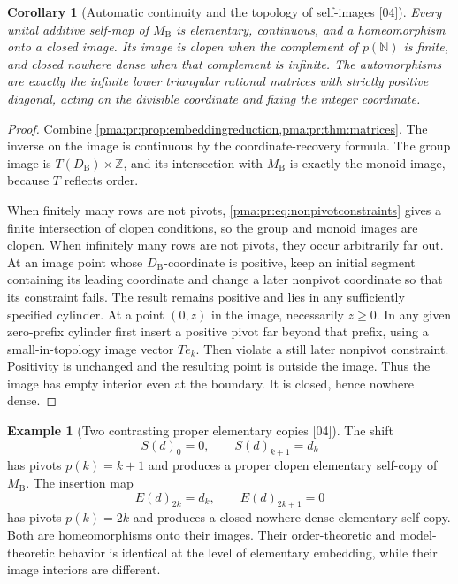 \documentclass[11pt]{article}
\numberwithin{equation}{section}
\newtheorem{corollary}[corollary]{Corollary}
\theoremstyle{definition}
\newtheorem{example}[example]{Example}
\theoremstyle{remark}
\newcommand{\N}{\mathbb N}
\newcommand{\Z}{\mathbb Z}
\newcommand{\MB}{M_{\mathrm B}}
\newcommand{\src}[1]{\textup{\textsf{\small[#1]}}}
\begin{document}
\begin{corollary}[Automatic continuity and the topology of self-images \src{04}]
\label{pma:pr:cor:imagetopology}
Every unital additive self-map of $\MB$ is elementary, continuous, and a
homeomorphism onto a closed image. Its image is clopen when the complement
of $p(\N)$ is finite, and closed nowhere dense when that complement is
infinite. The automorphisms are exactly the infinite lower triangular
rational matrices with strictly positive diagonal, acting on the divisible
coordinate and fixing the integer coordinate.
\end{corollary}

\begin{proof}
Combine \cref{pma:pr:prop:embeddingreduction,pma:pr:thm:matrices}. The inverse on the
image is continuous by the coordinate-recovery formula. The group image
is $T(D_{\mathrm B})\times\Z$, and its intersection with $\MB$ is exactly the
monoid image, because $T$ reflects order.

When finitely many rows are not pivots, \eqref{pma:pr:eq:nonpivotconstraints}
gives a finite intersection of clopen conditions, so the group and monoid
images are clopen. When infinitely many rows are not pivots, they occur
arbitrarily far out. At an image point whose $D_{\mathrm B}$-coordinate is
positive, keep an initial segment containing its leading coordinate and
change a later nonpivot coordinate so that its constraint fails. The
result remains positive and lies in any sufficiently specified cylinder.
At a point $(0,z)$ in the image, necessarily $z\geq0$. In any given
zero-prefix cylinder first insert a positive pivot far beyond that prefix,
using a small-in-topology image vector $Te_k$. Then violate a still later
nonpivot constraint. Positivity is unchanged and the resulting point is
outside the image. Thus the image has empty interior even at the boundary.
It is closed, hence nowhere dense.
\end{proof}

\begin{example}[Two contrasting proper elementary copies \src{04}]\label{pma:pr:ex:shifts}
The shift
\[
 S(d)_0=0,\qquad S(d)_{k+1}=d_k
\]
has pivots $p(k)=k+1$ and produces a proper clopen elementary self-copy of
$\MB$. The insertion map
\[
 E(d)_{2k}=d_k,\qquad E(d)_{2k+1}=0
\]
has pivots $p(k)=2k$ and produces a closed nowhere dense elementary
self-copy. Both are homeomorphisms onto their images. Their order-theoretic
and model-theoretic behavior is identical at the level of elementary
embedding, while their image interiors are different.
\end{example}
\end{document}
